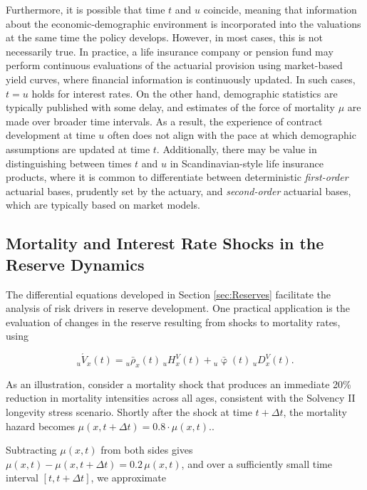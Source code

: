 \documentclass[12pt]{article}
\begin{document}
Furthermore, it is possible that time \( t \) and \( u \) coincide, meaning that information about the economic-demographic environment is incorporated into the valuations at the same time the policy develops. However, in most cases, this is not necessarily true. In practice, a life insurance company or pension fund may perform continuous evaluations of the actuarial provision using market-based yield curves, where financial information is continuously updated. In such cases, \( t = u \) holds for interest rates. On the other hand, demographic statistics are typically published with some delay, and estimates of the force of mortality \( \mu \) are made over broader time intervals. As a result, the experience of contract development at time \( u \) often does not align with the pace at which demographic assumptions are updated at time \( t \). Additionally, there may be value in distinguishing between times \( t \) and \( u \) in Scandinavian-style life insurance products, where it is common to differentiate between deterministic \textit{first-order} actuarial bases, prudently set by the actuary, and \textit{second-order} actuarial bases, which are typically based on market models.


\subsection{Mortality and Interest Rate Shocks in the Reserve Dynamics}

\color{blue}The differential equations developed in Section \ref{sec:Reserves} facilitate the analysis of risk drivers in reserve development. One practical application is the evaluation of changes in the reserve resulting from shocks to mortality rates, using  

\begin{equation} \nonumber
	{}_u\acute{V}_x(t) = {}_u\bar{\rho}_x(t) \, {}_uH_x^V(t) + {}_u\bar{\upvarphi}(t) \, {}_uD_x^V(t).
\end{equation}

As an illustration, consider a mortality shock that produces an immediate 20\% reduction in mortality intensities across all ages, consistent with the Solvency II longevity stress scenario. Shortly after the shock at time $t+\Delta t$, the mortality hazard becomes $\mu(x,t+\Delta t) = 0.8 \cdot \mu(x,t).$.

Subtracting $\mu(x,t)$ from both sides gives $\mu(x,t) - \mu(x,t+\Delta t) = 0.2 \, \mu(x,t)$, and over a sufficiently small time interval $[t, t+\Delta t]$, we approximate  
\end{document}
